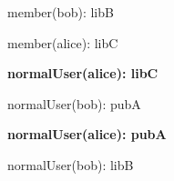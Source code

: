\documentclass{article}
\begin{document}
{\begin{minipage}{\tableWidth}
\begin{description}[align=left,leftmargin=1em,noitemsep,labelsep=\parindent]
\item{{member(\allowbreak{}bob): libB}}
\item{{member(\allowbreak{}alice): libC}}
\item\textbf{{normalUser(\allowbreak{}alice): libC}}
\item{{normalUser(\allowbreak{}bob): pubA}}
\item\textbf{{normalUser(\allowbreak{}alice): pubA}}
\item{{normalUser(\allowbreak{}bob): libB}}
\end{description}\end{minipage}}
\end{document}
